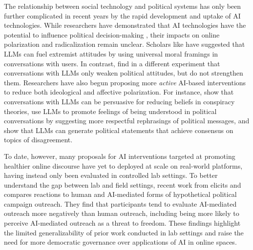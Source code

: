 The relationship between social technology and political systems has only been further complicated in recent years by the rapid development and uptake of AI technologies. While researchers have demonstrated that AI technologies have the potential to influence political decision-making \cite{Fisheretal2025BiasedLLMs}, their impacts on online polarization and radicalization remain unclear. Scholars like \citet{Hendricksetal2026LLMsExtremistAttitudes} have suggested that LLMs can fuel extremist attitudes by using universal moral framings in conversations with users. In contrast, \citet{SeviAndMekik2025AIWB} find in a different experiment that conversations with LLMs only weaken political attitudes, but do not strengthen them. Researchers have also begun proposing more \textit{active} AI-based interventions to reduce both ideological and affective polarization. For instance, \citet{Costelloetal2024ReducingConspiracyBeliefs} show that conversations with LLMs can be persuasive for reducing beliefs in conspiracy theories, \citet{Argyleetal2023LeveragingAI} use LLMs to promote feelings of being understood in political conversations by suggesting more respectful rephrasings of political messages, and \citet{Tessleretal2024HabermasMachine} show that LLMs can generate political statements that achieve consensus on topics of disagreement.

To date, however, many proposals for AI interventions targeted at promoting healthier online discourse have yet to deployed at scale on real-world platforms, having instead only been evaluated in controlled lab settings. To better understand the gap between lab and field settings, recent work from \citet{JungherrAndRauchfleisch2026HiddenCosts} elicits and compares reactions to human and AI-mediated forms of hypothetical political campaign outreach. They find that participants tend to evaluate AI-mediated outreach more negatively than human outreach, including being more likely to perceive AI-mediated outreach as a threat to freedom. These findings highlight the limited generalizability of prior work conducted in lab settings and raise the need for more democratic governance over applications of AI in online spaces.

